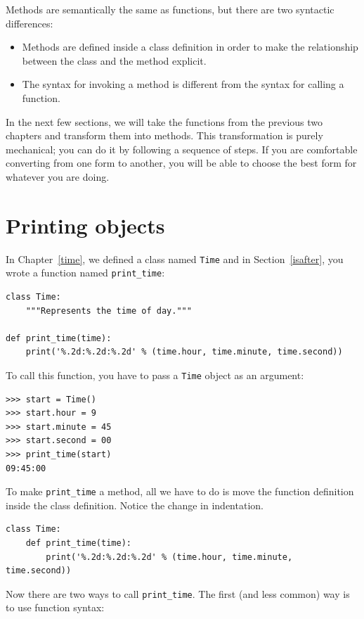 \documentclass[10pt]{book}
\begin{document}
Methods are semantically the same as functions, but there are
two syntactic differences:

\begin{itemize}

\item Methods are defined inside a class definition in order
to make the relationship between the class and the method explicit.

\item The syntax for invoking a method is different from the
syntax for calling a function.

\end{itemize}

In the next few sections, we will take the functions from the previous
two chapters and transform them into methods.  This transformation is
purely mechanical; you can do it by following a sequence of
steps.  If you are comfortable converting from one form to another,
you will be able to choose the best form for whatever you are doing.


\section{Printing objects}

In Chapter~\ref{time}, we defined a class named
{\tt Time} and in Section~\ref{isafter}, you 
wrote a function named \verb"print_time":

\begin{verbatim}
class Time:
    """Represents the time of day."""

def print_time(time):
    print('%.2d:%.2d:%.2d' % (time.hour, time.minute, time.second))
\end{verbatim}
%
To call this function, you have to pass a {\tt Time} object as an
argument:

\begin{verbatim}
>>> start = Time()
>>> start.hour = 9
>>> start.minute = 45
>>> start.second = 00
>>> print_time(start)
09:45:00
\end{verbatim}
%
To make \verb"print_time" a method, all we have to do is
move the function definition inside the class definition.  Notice
the change in indentation.

\begin{verbatim}
class Time:
    def print_time(time):
        print('%.2d:%.2d:%.2d' % (time.hour, time.minute, time.second))
\end{verbatim}
%
Now there are two ways to call \verb"print_time".  The first
(and less common) way is to use function syntax:
\end{document}
